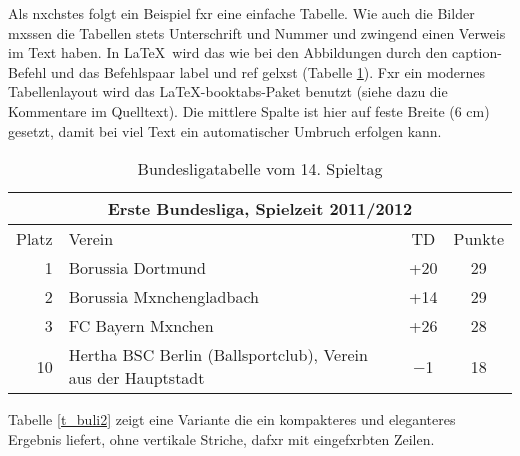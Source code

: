             Als nxchstes folgt ein Beispiel fxr eine einfache Tabelle. Wie auch die Bilder mxssen die Tabellen stets Unterschrift und Nummer und zwingend einen Verweis im Text haben. In \LaTeX\ wird das wie bei den Abbildungen durch den caption-Befehl und das Befehlspaar label und ref gelxst (Tabelle \ref{t_buli}). Fxr ein modernes Tabellenlayout wird das \LaTeX-booktabs-Paket benutzt (siehe dazu die Kommentare im Quelltext). Die mittlere Spalte ist hier auf feste Breite (6 cm) gesetzt, damit bei viel Text ein automatischer Umbruch erfolgen kann.

            \begin{table}[htp] 
                \centering
                \begin{tabular}{r|p{6cm}|c|c}  %
                    \toprule
                    \multicolumn{4}{c}{\large\bfseries Erste Bundesliga, Spielzeit 2011/2012}\\ \midrule
                        Platz & Verein & TD & Punkte\\ \midrule
                        1 & Borussia Dortmund & +20 & 29\\ \midrule
                        2 & Borussia Mxnchengladbach & +14 & 29\\ \midrule
                        3 & FC Bayern Mxnchen & +26 & 28\\ \midrule
                        10 & Hertha BSC Berlin (Ballsportclub), Verein aus der Hauptstadt & $-$1 & 18 \\
                    \bottomrule
                \end{tabular}
                \caption{Bundesligatabelle vom 14. Spieltag}\label{t_buli}
            \end{table}

            Tabelle \ref{t_buli2} zeigt eine Variante die ein kompakteres und eleganteres Ergebnis liefert, ohne vertikale Striche, dafxr mit eingefxrbten Zeilen.

